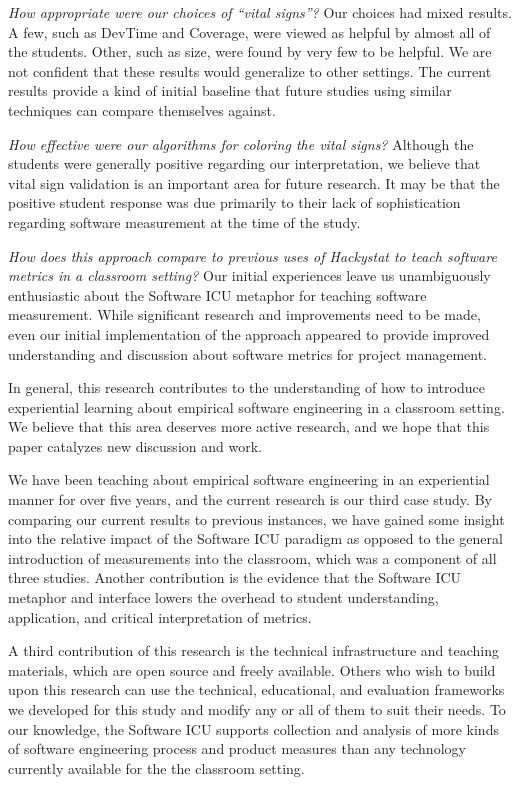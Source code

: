 \documentclass[times,10pt,twocolumn]{article}
\begin{document}
{\em How appropriate were our choices of ``vital signs''?} Our choices had
mixed results.  A few, such as DevTime and Coverage, were viewed as helpful
by almost all of the students.  Other, such as size, were found by very few
to be helpful.  We are not confident that these results would generalize to
other settings.  The current results provide a kind of initial baseline
that future studies using similar techniques can compare themselves
against.

{\em How effective were our algorithms for coloring the vital signs?}
Although the students were generally positive regarding our interpretation,
we believe that vital sign validation is an important area for future
research.  It may be that the positive student response was due primarily
to their lack of sophistication regarding software measurement at the time
of the study.

{\em How does this approach compare to previous uses of Hackystat to teach
software metrics in a classroom setting?}  Our initial experiences leave us
unambiguously enthusiastic about the Software ICU metaphor for teaching
software measurement. While significant research and improvements need to
be made, even our initial implementation of the approach appeared to
provide improved understanding and discussion about software metrics for
project management.

\label{sec:conclusions}


In general, this research contributes to the understanding of how to
introduce experiential learning about empirical software engineering in a
classroom setting.  We believe that this area deserves more active
research, and we hope that this paper catalyzes new discussion and work.

We have been teaching about empirical software engineering in an
experiential manner for over five years, and the current research is our
third case study.  By comparing our current results to previous instances,
we have gained some insight into the relative impact of the Software ICU
paradigm as opposed to the general introduction of measurements into the
classroom, which was a component of all three studies.  Another
contribution is the evidence that the Software ICU metaphor and interface
lowers the overhead to student understanding, application, and critical
interpretation of metrics.

A third contribution of this research is the technical infrastructure and
teaching materials, which are open source and freely available.  Others who
wish to build upon this research can use the technical, educational, and
evaluation frameworks we developed for this study and modify any or all of
them to suit their needs.  To our knowledge, the Software ICU supports
collection and analysis of more kinds of software engineering process and
product measures than any technology currently available for the the
classroom setting.
\end{document}
